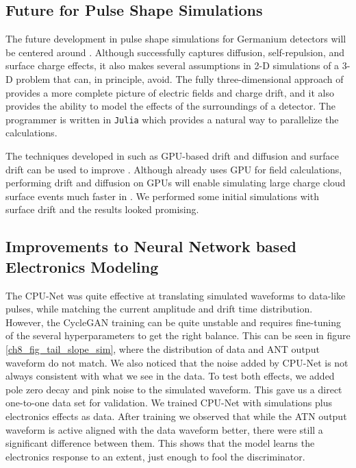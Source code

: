 \subsection{Future for Pulse Shape Simulations}

The future development in pulse shape simulations for Germanium detectors will be centered around {\ssd} . Although {\ehd} successfully captures diffusion, self-repulsion, and surface charge effects, it also makes several assumptions in 2-D simulations of a 3-D problem that {\ssd} can, in principle, avoid. The fully three-dimensional approach of {\ssd} provides a more complete picture of electric fields and charge drift, and it also provides the ability to model the effects of the surroundings of a detector. The programmer is written in \texttt{Julia} which provides a natural way to parallelize the calculations.

The techniques developed in {\ehd} such as GPU-based drift and diffusion and surface drift can be used to improve {\ssd}. Although {\ssd} already uses GPU for field calculations, performing drift and diffusion on GPUs will enable simulating large charge cloud surface events much faster in {\ssd}. We performed some initial {\ssd} simulations with surface drift and the results looked promising.


\subsection{Improvements to Neural Network based Electronics Modeling}
The CPU-Net was quite effective at translating simulated waveforms to data-like pulses, while matching the current amplitude and drift time distribution. However, the CycleGAN training can be quite unstable and requires fine-tuning of the several hyperparameters to get the right balance. This can be seen in figure \ref{ch8_fig_tail_slope_sim}, where the distribution of data and ANT output waveform do not match. We also noticed that the noise added by CPU-Net is not always consistent with what we see in the data. To test both effects, we added pole zero decay and pink noise to the simulated waveform. This gave us a direct one-to-one data set for validation. We trained CPU-Net with simulations plus electronics effects as data. After training we observed that while the ATN output waveform is active aligned with the data waveform better, there were still a significant difference between them. This shows that the model learns the electronics response to an extent, just enough to fool the discriminator.

